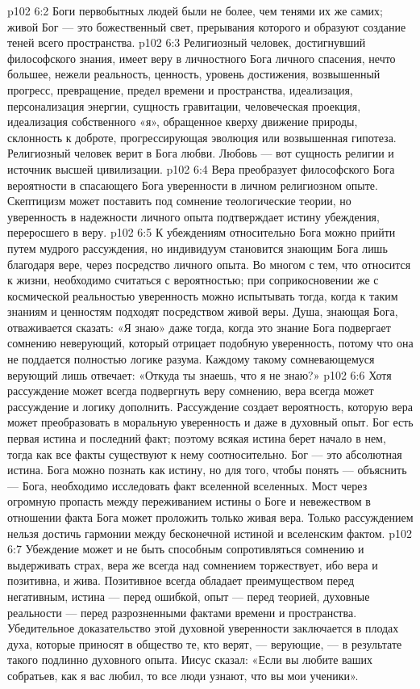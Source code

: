 \vs p102 6:2 Боги первобытных людей были не более, чем тенями их же самих; живой Бог --- это божественный свет, прерывания которого и образуют создание теней всего пространства.
\vs p102 6:3 \pc Религиозный человек, достигнувший философского знания, имеет веру в личностного Бога личного спасения, нечто большее, нежели реальность, ценность, уровень достижения, возвышенный прогресс, превращение, предел времени и пространства, идеализация, персонализация энергии, сущность гравитации, человеческая проекция, идеализация собственного «я», обращенное кверху движение природы, склонность к доброте, прогрессирующая эволюция или возвышенная гипотеза. Религиозный человек верит в Бога любви. Любовь --- вот сущность религии и источник высшей цивилизации.
\vs p102 6:4 Вера преобразует философского Бога вероятности в спасающего Бога уверенности в личном религиозном опыте. Скептицизм может поставить под сомнение теологические теории, но уверенность в надежности личного опыта подтверждает истину убеждения, переросшего в веру.
\vs p102 6:5 К убеждениям относительно Бога можно прийти путем мудрого рассуждения, но индивидуум становится знающим Бога лишь благодаря вере, через посредство личного опыта. Во многом с тем, что относится к жизни, необходимо считаться с вероятностью; при соприкосновении же с космической реальностью уверенность можно испытывать тогда, когда к таким знаниям и ценностям подходят посредством живой веры. Душа, знающая Бога, отваживается сказать: «Я знаю» даже тогда, когда это знание Бога подвергает сомнению неверующий, который отрицает подобную уверенность, потому что она не поддается полностью логике разума. Каждому такому сомневающемуся верующий лишь отвечает: «Откуда ты знаешь, что я не знаю?»
\vs p102 6:6 \pc Хотя рассуждение может всегда подвергнуть веру сомнению, вера всегда может рассуждение и логику дополнить. Рассуждение создает вероятность, которую вера может преобразовать в моральную уверенность и даже в духовный опыт. Бог есть первая истина и последний факт; поэтому всякая истина берет начало в нем, тогда как все факты существуют к нему соотносительно. Бог --- это абсолютная истина. Бога можно познать как истину, но для того, чтобы понять --- объяснить --- Бога, необходимо исследовать факт вселенной вселенных. Мост через огромную пропасть между переживанием истины о Боге и невежеством в отношении факта Бога может проложить только живая вера. Только рассуждением нельзя достичь гармонии между бесконечной истиной и вселенским фактом.
\vs p102 6:7 Убеждение может и не быть способным сопротивляться сомнению и выдерживать страх, вера же всегда над сомнением торжествует, ибо вера и позитивна, и жива. Позитивное всегда обладает преимуществом перед негативным, истина --- перед ошибкой, опыт --- перед теорией, духовные реальности --- перед разрозненными фактами времени и пространства. Убедительное доказательство этой духовной уверенности заключается в плодах духа, которые приносят в общество те, кто верят, --- верующие, --- в результате такого подлинно духовного опыта. Иисус сказал: «Если вы любите ваших собратьев, как я вас любил, то все люди узнают, что вы мои ученики».
